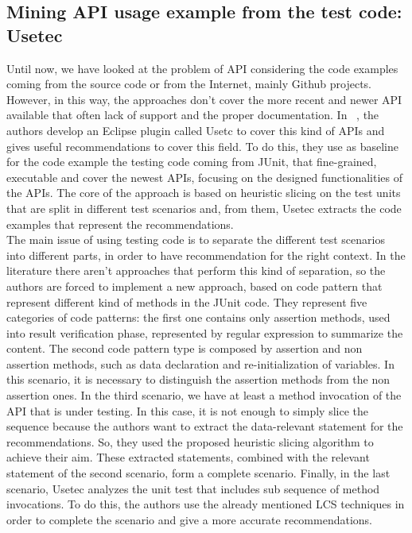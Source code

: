 \subsection{Mining API usage example from the test code: Usetec}
Until now, we have looked at the problem of API considering the code examples coming from the source code or from the Internet, mainly Github projects. However, in this way, the approaches don't cover the more recent and newer API available that often lack of support and the proper documentation. In ~\cite{zhu_mining_2014}, the authors develop an Eclipse plugin called Usetc to cover this kind of APIs and gives useful recommendations to cover this field. To do this, they use as baseline for the code example the testing code coming from JUnit, that fine-grained, executable and cover the newest APIs, focusing on the designed functionalities of the APIs. The core of the approach is based on heuristic slicing on the test units that are split in different test scenarios and, from them, Usetec extracts the code examples that represent the recommendations. \\
The main issue of using testing code is to separate the different test scenarios into different parts, in order to have recommendation for the right context. In the literature there aren't approaches that perform this kind of separation, so the authors are forced to implement a new approach, based on code pattern that represent different kind of methods in the JUnit code. They represent five categories of code patterns: the first one contains only assertion methods, used into result verification phase, represented by regular expression to summarize the content. The second code pattern type is composed by assertion and non assertion methods, such as data declaration and re-initialization of variables. In this scenario, it is necessary to distinguish the assertion methods from the non assertion ones. In the third scenario, we have at least a method invocation of the API that is under testing. In this case, it is not enough to simply slice the sequence because the authors want to extract the data-relevant statement for the recommendations. So, they used the proposed heuristic slicing algorithm to achieve their aim. These extracted statements, combined with the relevant statement of the second scenario, form a complete scenario. Finally, in the last scenario, Usetec analyzes the unit test that includes sub sequence of method invocations. To do this, the authors use the already mentioned LCS techniques in order to complete the scenario and give a more accurate recommendations. \newline
